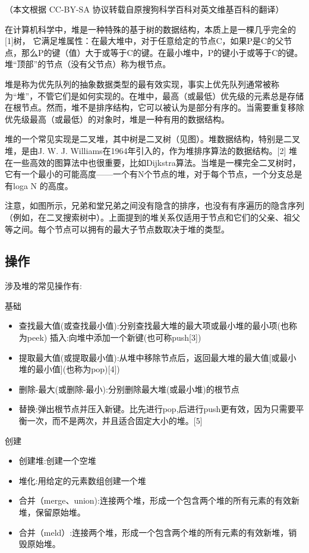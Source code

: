 
（本文根据 CC-BY-SA 协议转载自原搜狗科学百科对英文维基百科的翻译）

在计算机科学中，堆是一种特殊的基于树的数据结构，本质上是一棵几乎完全的[1]树， 它满足堆属性：在最大堆中，对于任意给定的节点C，如果P是C的父节点，那么P的键（值）大于或等于C的键。在最小堆中，P的键小于或等于C的键。堆“顶部”的节点（没有父节点）称为根节点。

堆是称为优先队列的抽象数据类型的最有效实现，事实上优先队列通常被称为“堆”，不管它们是如何实现的。在堆中，最高（或最低）优先级的元素总是存储在根节点。然而，堆不是排序结构，它可以被认为是部分有序的。当需要重复移除优先级最高（或最低）的对象时，堆是一种有用的数据结构。

堆的一个常见实现是二叉堆，其中树是二叉树（见图）。堆数据结构，特别是二叉堆，是由J. W. J. Williams在1964年引入的，作为堆排序算法的数据结构。[2] 堆在一些高效的图算法中也很重要，比如Dijkstra算法。当堆是一棵完全二叉树时，它有一个最小的可能高度——一个有N个节点的堆，对于每个节点，一个分支总是有loga N 的高度。

注意，如图所示，兄弟和堂兄弟之间没有隐含的排序，也没有有序遍历的隐含序列（例如，在二叉搜索树中）。上面提到的堆关系仅适用于节点和它们的父亲、祖父等之间。每个节点可以拥有的最大子节点数取决于堆的类型。

\subsection{操作}
涉及堆的常见操作有:

基础
\begin{itemize}
\item 查找最大值(或查找最小值):分别查找最大堆的最大项或最小堆的最小项(也称为peek)
插入:向堆中添加一个新键(也可称push[3])
\item 提取最大值(或提取最小值):从堆中移除节点后，返回最大堆的最大值[或最小堆的最小值](也称为pop)[4])
\item 删除-最大(或删除-最小):分别删除最大堆(或最小堆)的根节点
\item 替换:弹出根节点并压入新键。比先进行pop,后进行push更有效，因为只需要平衡一次，而不是两次，并且适合固定大小的堆。[5]
\end{itemize}

创建
\begin{itemize}
\item 创建堆:创建一个空堆
\item 堆化:用给定的元素数组创建一个堆
\item 合并（merge、union):连接两个堆，形成一个包含两个堆的所有元素的有效新堆，保留原始堆。
\item 合并（meld）:连接两个堆，形成一个包含两个堆的所有元素的有效新堆，销毁原始堆。
\end{itemize}

